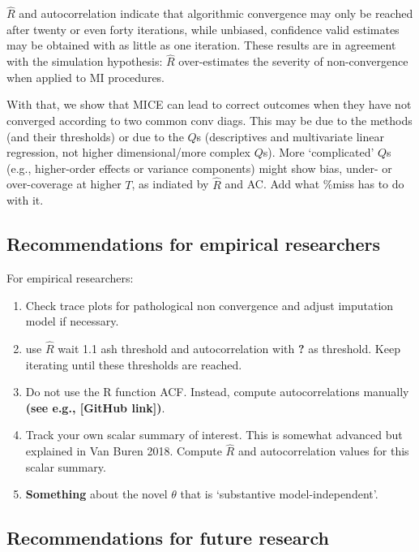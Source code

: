 \documentclass[Royal,times,sageh]{sagej}
\begin{document}
\(\widehat{R}\) and autocorrelation indicate that algorithmic convergence may only be reached after twenty or even forty iterations, while unbiased, confidence valid estimates may be obtained with as little as one iteration. These results are in agreement with the simulation hypothesis: \(\widehat{R}\) over-estimates the severity of non-convergence when applied to MI procedures.

With that, we show that MICE can lead to correct outcomes when they have not converged according to two common conv diags. This may be due to the methods (and their thresholds) or due to the \(Q\)s (descriptives and multivariate linear regression, not higher dimensional/more complex \(Q\)s). More `complicated' \(Q\)s (e.g., higher-order effects or variance components) might show bias, under- or over-coverage at higher \(T\), as indiated by \(\widehat{R}\) and AC. Add what \%miss has to do with it.

\hypertarget{recommendations-for-empirical-researchers}{%
\subsection{Recommendations for empirical researchers}\label{recommendations-for-empirical-researchers}}

For empirical researchers:

\begin{enumerate}
\def\labelenumi{\arabic{enumi}.}
\item
  Check trace plots for pathological non convergence and adjust imputation model if necessary.
\item
  use \(\widehat{R}\) wait 1.1 ash threshold and autocorrelation with \textbf{?} as threshold. Keep iterating until these thresholds are reached.
\item
  Do not use the R function ACF. Instead, compute autocorrelations manually \textbf{(see e.g., {[}GitHub link{]})}.
\item
  Track your own scalar summary of interest. This is somewhat advanced but explained in Van Buren 2018. Compute \(\widehat{R}\) and autocorrelation values for this scalar summary.
\item
  \textbf{Something} about the novel \(\theta\) that is `substantive model-independent'.
\end{enumerate}

\hypertarget{recommendations-for-future-research}{%
\subsection{Recommendations for future research}\label{recommendations-for-future-research}}
\end{document}
